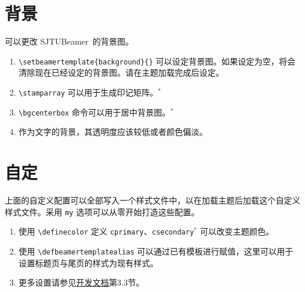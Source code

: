 \documentclass[
    UTF8,
    heading=true,
    12pt,
    a4paper
]{ctexrep}
\newenvironment{commentlist}{\begin{enumerate}\small}{\end{enumerate}}
\def\themename{\textsf{SJTUBeamer}}
\begin{document}
\chapter{背景}

可以更改 \themename\ 的背景图。


\begin{commentlist}
  \item \texttt{\textbackslash{}setbeamertemplate\{background\}\{\}} 可以设定背景图。如果设定为空，将会清除现在已经设定的背景图。请在主题加载完成后设定。
  \item \texttt{\textbackslash{}stamparray} 可以用于生成印记矩阵。$^*$
  \item \texttt{\textbackslash{}bgcenterbox} 命令可以用于居中背景图。$^*$
  \item 作为文字的背景，其透明度应该较低或者颜色偏淡。
\end{commentlist}

\chapter{自定}

上面的自定义配置可以全部写入一个样式文件中，以在加载主题后加载这个自定义样式文件。采用 \texttt{my} 选项可以从零开始打造这些配置。



\begin{commentlist}
  \item 使用 \texttt{\textbackslash{}definecolor} 定义 \texttt{cprimary}、\texttt{csecondary}$^*$ 可以改变主题颜色。
  \item 使用 \texttt{\textbackslash{}defbeamertemplatealias} 可以通过已有模板进行赋值，这里可以用于设置标题页与尾页的样式为现有样式。
  \item 更多设置请参见\href{run:sjtubeamerdevguide.pdf}{开发文档}第3.3节。
\end{commentlist}

\end{document}
